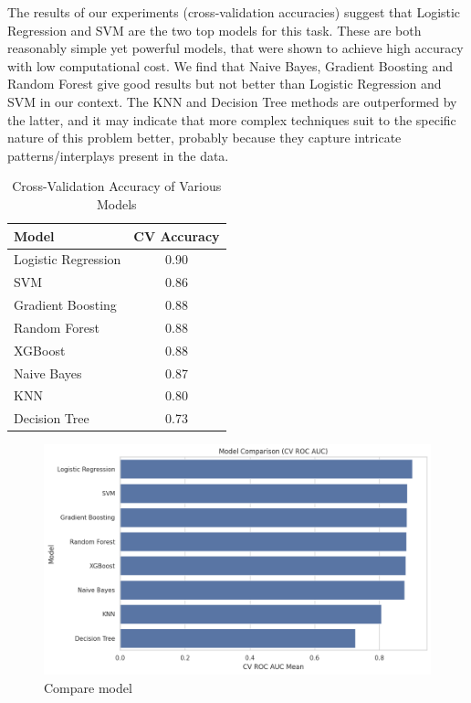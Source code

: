 The results of our experiments (cross-validation accuracies) suggest that Logistic Regression and SVM are the two top models for this task. These are both reasonably simple yet powerful models, that were shown to achieve high accuracy with low computational cost. We find that Naive Bayes, Gradient Boosting and Random Forest give good results but not better than Logistic Regression and SVM in our context. The KNN and Decision Tree methods are outperformed by the latter, and it may indicate that more complex techniques suit to the specific nature of this problem better, probably because they capture intricate patterns/interplays present in the data.

\begin{table}[ht]
\centering
\begin{tabular}{|l|c|}
\hline
\textbf{Model}            & \textbf{CV Accuracy} \\ \hline
Logistic Regression        & 0.90              \\ \hline
SVM         & 0.86              \\ \hline
Gradient Boosting                & 0.88              \\ \hline
Random Forest                         & 0.88              \\ \hline
XGBoost             & 0.88              \\ \hline
Naive Bayes                    & 0.87              \\ \hline
KNN                         & 0.80              \\ \hline
Decision Tree              & 0.73              \\ \hline
\end{tabular}
\caption{Cross-Validation Accuracy of Various Models}
\label{tab:cv_accuracy}
\end{table}

 
\begin{figure}
    \centering
    \includegraphics[width=0.75\linewidth]{Chap4/model-comparision.png}
    \caption{Compare model}
    \label{fig:placeholder}
\end{figure}

